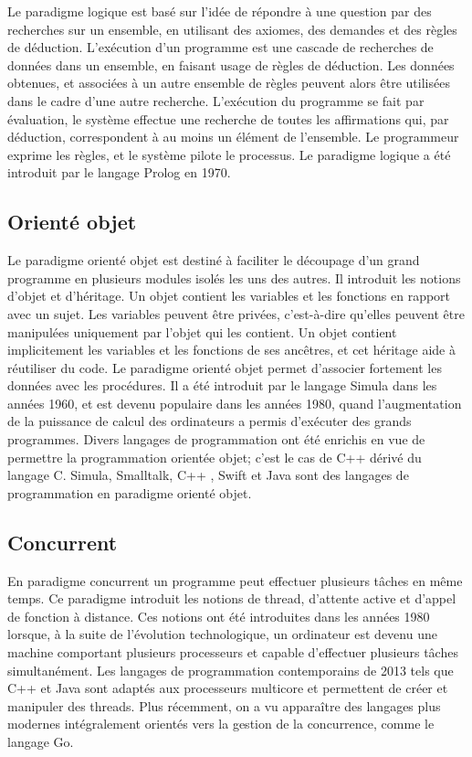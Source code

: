 \documentclass[a4paper,12pt]{article}
\begin{document}
Le paradigme logique est basé sur l'idée de répondre à une question par des recherches sur un ensemble, en utilisant des axiomes, des demandes et des règles de déduction. L'exécution d'un programme est une cascade de recherches de données dans un ensemble, en faisant usage de règles de déduction. Les données obtenues, et associées à un autre ensemble de règles peuvent alors être utilisées dans le cadre d'une autre recherche. L'exécution du programme se fait par évaluation, le système effectue une recherche de toutes les affirmations qui, par déduction, correspondent à au moins un élément de l'ensemble. Le programmeur exprime les règles, et le système pilote le processus\cite{jana}. Le paradigme logique a été introduit par le langage Prolog en 1970\cite{kumar}.

\subsection{Orienté objet}

Le paradigme orienté objet est destiné à faciliter le découpage d'un grand programme en plusieurs modules isolés les uns des autres. Il introduit les notions d'objet et d'héritage. Un objet contient les variables et les fonctions en rapport avec un sujet. Les variables peuvent être privées, c'est-à-dire qu'elles peuvent être manipulées uniquement par l'objet qui les contient. Un objet contient implicitement les variables et les fonctions de ses ancêtres, et cet héritage aide à réutiliser du code\cite{kumar}. Le paradigme orienté objet permet d'associer fortement les données avec les procédures\cite{jana}. Il a été introduit par le langage Simula dans les années 1960, et est devenu populaire dans les années 1980, quand l'augmentation de la puissance de calcul des ordinateurs a permis d'exécuter des grands programmes\cite{kumar}. Divers langages de programmation ont été enrichis en vue de permettre la programmation orientée objet; c'est le cas de C++ dérivé du langage C. Simula, Smalltalk, C++ , Swift et Java sont des langages de programmation en paradigme orienté objet\cite{jana}.
\subsection{Concurrent}

En paradigme concurrent un programme peut effectuer plusieurs tâches en même temps. Ce paradigme introduit les notions de thread, d'attente active et d'appel de fonction à distance\cite{kumar}. Ces notions ont été introduites dans les années 1980 lorsque, à la suite de l'évolution technologique, un ordinateur est devenu une machine comportant plusieurs processeurs et capable d'effectuer plusieurs tâches simultanément. Les langages de programmation contemporains de 2013 tels que C++ et Java sont adaptés aux processeurs multicore et permettent de créer et manipuler des threads\cite{kumar}. Plus récemment, on a vu apparaître des langages plus modernes intégralement orientés vers la gestion de la concurrence, comme le langage Go.
\end{document}
